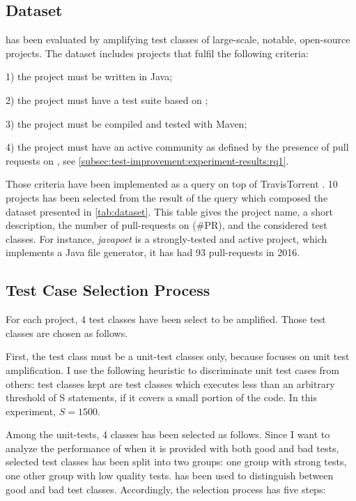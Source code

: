 \subsection{Dataset}
\label{subsec:test-improvement:experiment-protocol:dataset}

\dspot has been evaluated by amplifying test classes of large-scale, notable, open-source projects. 
The dataset includes projects that fulfil the following criteria:

1) the project must be written in Java; 

2) the project must have a test suite based on \junit;

3) the project must be compiled and tested with Maven;

4) the project must have an active community as defined by the presence of pull requests on \gh, see \autoref{subsec:test-improvement:experiment-results:rq1}. 



Those criteria have been implemented as a query on top of TravisTorrent \cite{msr17challenge}. 
10 projects has been selected from the result of the query which composed the dataset presented in \autoref{tab:dataset}.
This table gives the project name, a short description, the number of pull-requests on \gh (\#PR), and the considered test classes.
For instance, \emph{javapoet} is a strongly-tested and active project, which implements a Java file generator, it has had 93 pull-requests in 2016.


\subsection{Test Case Selection Process}
\label{subsec:test-improvement:experiment-protocol:test-preparation}

For each project, 4 test classes have been select to be amplified. 
Those test classes are chosen as follows.

First, the test class must be a unit-test classes only, because \dspot focuses on unit test amplification. 
I use the following heuristic to discriminate unit test cases from others: 
test classes kept are test classes which executes less than an arbitrary threshold of S statements, \ie if it covers a small portion of the code.
In this experiment, $S=1500$.

Among the unit-tests, 4 classes has been selected as follows.
Since I want to analyze the performance of \dspot when it is provided with both good and bad tests, selected test classes has been split into two groups: 
one group with strong tests, one other group with low quality tests.
\ms has been used to distinguish between good and bad test classes.
Accordingly, the selection process has five steps:

